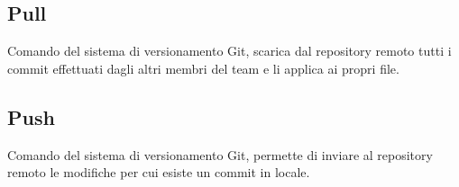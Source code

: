 \subsection{Pull}
Comando del sistema di versionamento Git, scarica dal repository remoto tutti i commit effettuati dagli altri membri del team e li applica ai propri file.

\subsection{Push}
Comando del sistema di versionamento Git, permette di inviare al repository remoto le modifiche per cui esiste un commit in locale.